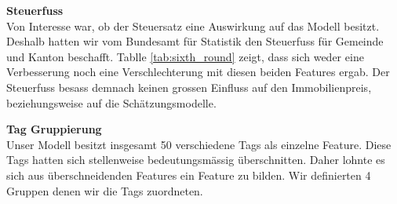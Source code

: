 \begin{table}[ht]
\centering
{}
\caption{Statistische Werte des Kaufpreises nach der Outlier Detection}
\label{tab:price_outlier}
\end{table}

\begin{table}[ht]
\centering
{}
\caption{Ergebnisse mit Einbezug des Steuerfusses}
\label{tab:sixth_round}
\end{table}

\newpage
\clearpage
\textbf{Steuerfuss}\\
Von Interesse war, ob der Steuersatz eine Auswirkung auf das Modell besitzt. Deshalb hatten wir vom Bundesamt für Statistik den Steuerfuss für Gemeinde und Kanton beschafft. Tablle \ref{tab:sixth_round} zeigt, dass sich weder eine Verbesserung noch eine Verschlechterung mit diesen beiden Features ergab. Der Steuerfuss besass demnach keinen grossen Einfluss auf den Immobilienpreis, beziehungsweise auf die Schätzungsmodelle.

\textbf{Tag Gruppierung}\\
Unser Modell besitzt insgesamt 50 verschiedene Tags als einzelne Feature. Diese Tags hatten sich stellenweise bedeutungsmässig überschnitten. Daher lohnte es sich aus überschneidenden Features ein Feature zu bilden. Wir definierten 4 Gruppen denen wir die Tags zuordneten. 

